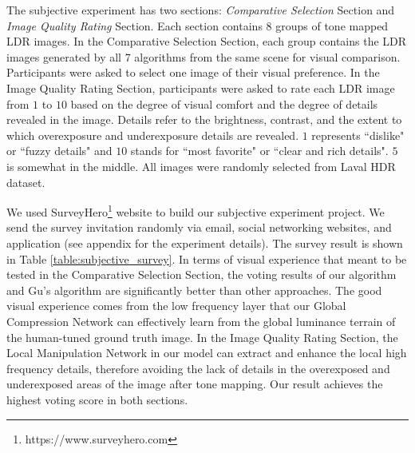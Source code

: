 \documentclass[journal]{IEEEtran}
\begin{document}
The subjective experiment has two sections: \textit{Comparative Selection} Section and \textit{Image Quality Rating} Section. Each section contains 8 groups of tone mapped LDR images.  In the Comparative Selection Section, each group contains the LDR images generated by all 7 algorithms from the same scene for visual comparison. Participants were asked to select one image of their visual preference.  In the Image Quality Rating Section, participants were asked to rate each LDR image from $1$ to $10$ based on the degree of visual comfort and the degree of details revealed in the image.   Details refer to the brightness, contrast, and the extent to which overexposure and underexposure details are revealed.  $1$ represents ``dislike" or ``fuzzy details" and $10$ stands for ``most favorite" or ``clear and rich details".  $5$ is somewhat in the middle. All images were randomly selected from Laval HDR dataset.

We used SurveyHero\footnote{https://www.surveyhero.com}  website to build our subjective experiment project.  We send the survey invitation randomly via email, social networking websites, and application (see appendix for the experiment details).  The survey result is shown in Table \ref{table:subjective_survey}.  In terms of visual experience that meant to be tested in the Comparative Selection Section, the voting results of our algorithm and Gu's algorithm are significantly better than other approaches. The good visual experience comes from the low frequency layer that our Global Compression Network can effectively learn from the global luminance terrain of the human-tuned ground truth image. In the Image Quality Rating Section, the Local Manipulation Network in our model can extract and enhance the local high frequency details, therefore avoiding the lack of details in the overexposed and underexposed areas of the image after tone mapping. Our result achieves the highest voting score in both sections.  
\end{document}
